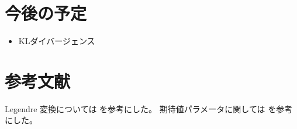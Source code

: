 \documentclass[report]{jlreq}
\begin{document}

%
%
%

%
\section*{今後の予定}

\begin{itemize}
    \item KLダイバージェンス
\end{itemize}

%
\section*{参考文献}

Legendre 変換については
\cite{niculescu_convex_2018}
を参考にした。
期待値パラメータに関しては
\cite{wainwright_graphical_2007}を参考にした。

\nocite{amari_information_2016}
\end{document}

